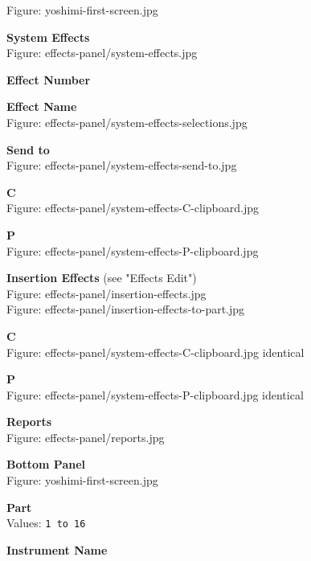 \documentclass[
 11pt,
 twoside,
 a4paper,
 headinclude,
 footinclude,
 final                                 %
]{article}
\begin{document}
\begin{enumber}
      Figure: yoshimi-first-screen.jpg
   \begin{enumber}
      \item \textbf{System Effects} \\
         Figure: effects-panel/system-effects.jpg
      \begin{enumber}
         \item \textbf{Effect Number}
         \item \textbf{Effect Name} \\
            Figure: effects-panel/system-effects-selections.jpg
         \item \textbf{Send to} \\
            Figure: effects-panel/system-effects-send-to.jpg
         \item \textbf{C} \\
            Figure: effects-panel/system-effects-C-clipboard.jpg
         \item \textbf{P} \\
            Figure: effects-panel/system-effects-P-clipboard.jpg
      \end{enumber}
      \item \textbf{Insertion Effects} (see "Effects Edit") \\
         Figure: effects-panel/insertion-effects.jpg \\
         Figure: effects-panel/insertion-effects-to-part.jpg
      \begin{enumber}
         \item \textbf{C} \\
            Figure: effects-panel/system-effects-C-clipboard.jpg identical
         \item \textbf{P} \\
            Figure: effects-panel/system-effects-P-clipboard.jpg identical
      \end{enumber}
      \item \textbf{Reports} \\
         Figure: effects-panel/reports.jpg
   \end{enumber}
   \item \textbf{Bottom Panel} \\
      Figure: yoshimi-first-screen.jpg
   \begin{enumber}
      \item \textbf{Part} \\
         Values: \texttt{1 to 16}
      \item \textbf{Instrument Name}

\end{enumber}
\end{enumber}
\end{document}
